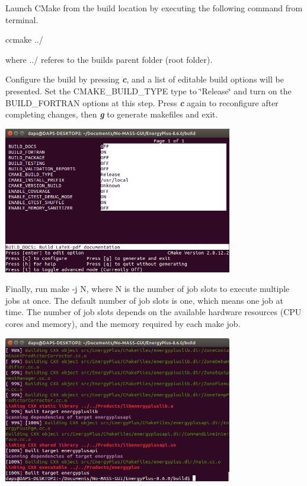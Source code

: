 \begin{DoxyEnumerate}
\item Launch C\+Make from the build location by executing the following command from terminal. 
\begin{DoxyCode}
ccmake ../
\end{DoxyCode}
 where {\ttfamily ../} referes to the build\textquotesingle{}s parent folder (root folder).
\item Configure the build by pressing {\itshape {\bfseries c}}, and a list of editable build options will be presented. Set the C\+M\+A\+K\+E\+\_\+\+B\+U\+I\+L\+D\+\_\+\+T\+Y\+PE type to \char`\"{}\+Release\char`\"{} and turn on the B\+U\+I\+L\+D\+\_\+\+F\+O\+R\+T\+R\+AN options at this step. Press {\itshape {\bfseries c}} again to reconfigure after completing changes, then {\itshape {\bfseries g}} to generate makefiles and exit. 
\begin{DoxyImage}
\includegraphics[width=10cm]{ccmake_gui_step2.png}
\end{DoxyImage}
  
\item Finally, run {\ttfamily make -\/j N}, where {\ttfamily N} is the number of job slots to execute multiple jobs at once. The default number of job slots is one, which means one job at time. The number of job slots depends on the available hardware resources (C\+PU cores and memory), and the memory required by each make job. 
\begin{DoxyImage}
\includegraphics[width=10cm]{make_output.png}
\end{DoxyImage}
  

\end{DoxyEnumerate}
